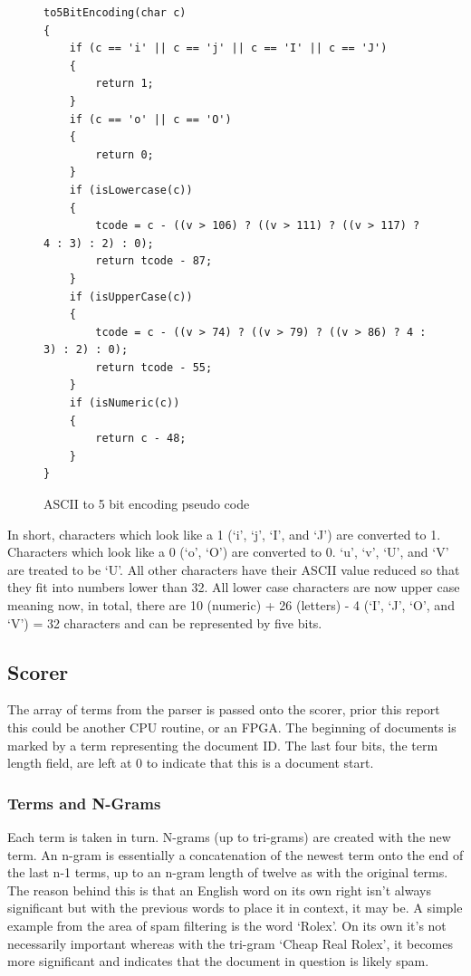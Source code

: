 \begin{figure}[H]
\small\begin{verbatim}
to5BitEncoding(char c)
{
    if (c == 'i' || c == 'j' || c == 'I' || c == 'J')
    {
        return 1;
    }
    if (c == 'o' || c == 'O')
    {
        return 0;
    }
    if (isLowercase(c))
    {
        tcode = c - ((v > 106) ? ((v > 111) ? ((v > 117) ? 4 : 3) : 2) : 0);
        return tcode - 87;
    }
    if (isUpperCase(c))
    {
        tcode = c - ((v > 74) ? ((v > 79) ? ((v > 86) ? 4 : 3) : 2) : 0);
        return tcode - 55;
    }
    if (isNumeric(c))
    {
        return c - 48;
    }
}
\end{verbatim}
\caption{ASCII to 5 bit encoding pseudo code}
\label{baudotCode}
\end{figure}

In short, characters which look like a 1 (`i', `j', `I', and `J') are converted
to 1. Characters which look like a 0 (`o', `O') are converted to 0. `u', `v',
`U', and `V' are treated to be `U'. All other characters have their ASCII value
reduced so that they fit into numbers lower than 32. All lower case characters
are now upper case meaning now, in total, there are 10 (numeric) + 26 (letters)
- 4 (`I', `J', `O', and `V') = 32 characters and can be represented by five
bits.

\subsection{Scorer}

The array of terms from the parser is passed onto the scorer, prior this report
this could be another CPU routine, or an FPGA. The beginning of documents is
marked by a term representing the document ID. The last four bits, the term
length field, are left at 0 to indicate that this is a document start.

\subsubsection{Terms and N-Grams}

Each term is taken in turn. N-grams (up to tri-grams) are created with the new
term. An n-gram is essentially a concatenation of the newest term onto the end
of the last n-1 terms, up to an n-gram length of twelve as with the original
terms. The reason behind this is that an English word on its own right isn't
always significant but with the previous words to place it in context, it may
be. A simple example from the area of spam filtering is the word `Rolex'. On its
own it's not necessarily important whereas with the tri-gram `Cheap Real Rolex',
it becomes more significant and indicates that the document in question is
likely spam.

